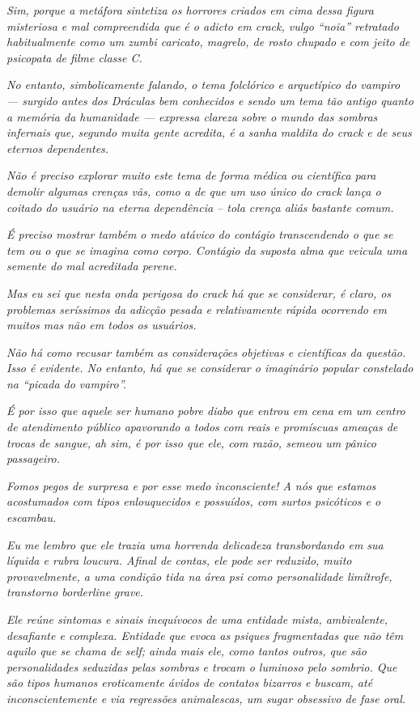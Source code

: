 \emph{Sim, porque a metáfora sintetiza os horrores criados em cima dessa
figura misteriosa e mal compreendida que é o adicto em crack, vulgo
``noia'' retratado habitualmente como um zumbi caricato, magrelo, de
rosto chupado e com jeito de psicopata de filme classe C.}~

\emph{No entanto, simbolicamente falando, o tema folclórico e
arquetípico do vampiro --- surgido antes dos Dráculas bem conhecidos e
sendo um tema tão antigo quanto a memória da humanidade --- expressa
clareza sobre o mundo das sombras infernais que, segundo muita gente
acredita, é a sanha maldita do crack e de seus eternos dependentes.}~

\emph{Não é preciso explorar muito este tema de forma médica ou
científica para demolir algumas crenças vãs, como a de que um uso único
do crack lança o coitado do usuário na eterna dependência -- tola crença
aliás bastante comum.}~

\emph{É preciso mostrar também o medo atávico do contágio transcendendo
o que se tem ou o que se imagina como corpo. Contágio da suposta alma que veicula uma semente do mal acreditada perene.}~

\emph{Mas eu sei que nesta onda perigosa do crack há que se considerar,
é claro, os problemas seríssimos da adicção pesada e relativamente
rápida ocorrendo em muitos mas não em todos os usuários.}~

\emph{Não há como recusar também as considerações objetivas e
científicas da questão. Isso é evidente. No entanto, há que se
considerar o imaginário popular constelado na ``picada do vampiro''.}~

\emph{É por isso que aquele ser humano pobre diabo que entrou em cena em
um centro de atendimento público apavorando a todos com reais e
promíscuas ameaças de trocas de sangue, ah sim, é por isso que ele, com
razão, semeou um pânico passageiro.}~

\emph{Fomos pegos de surpresa e por esse medo inconsciente! A nós que
estamos acostumados com tipos enlouquecidos e possuídos, com surtos
psicóticos e o escambau.}~

\emph{Eu me lembro que ele trazia uma horrenda delicadeza transbordando
em sua líquida e rubra loucura. Afinal de contas, ele pode ser reduzido,
muito provavelmente, a uma condição tida na área psi como personalidade
limítrofe, transtorno borderline grave.}~

\emph{Ele reúne sintomas e sinais inequívocos de uma entidade mista,
ambivalente, desafiante e complexa. Entidade que evoca as psiques
fragmentadas que não têm aquilo que se chama de self; ainda mais ele,
como tantos outros, que são personalidades seduzidas pelas sombras e
trocam o luminoso pelo sombrio. Que são tipos humanos eroticamente
ávidos de contatos bizarros e buscam, até inconscientemente e via
regressões animalescas, um sugar obsessivo de fase oral.}~

